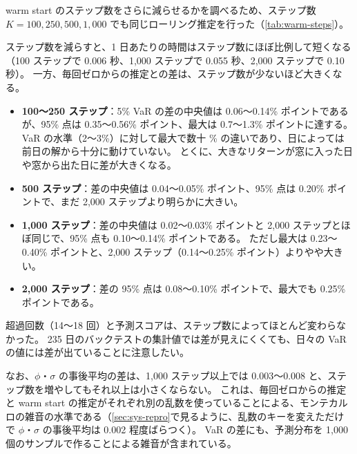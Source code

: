 warm start のステップ数をさらに減らせるかを調べるため、ステップ数 $K = 100, 250, 500, 1{,}000$ でも同じローリング推定を行った（\cref{tab:warm-steps}）。

\begin{table}[tbp]
  \centering
  \caption{warm start のステップ数と、毎回ゼロからの推定（10,000 ステップ）との差（推定窓 250 日、検証 235 日、初日を除く）。
    差は日ごとの差の絶対値の要約。超過は 5\% VaR の超過回数、予測スコアは対数予測スコアの平均、時間は 1 日あたりの最適化の時間の中央値。
    2,000 ステップと毎回ゼロからの行は\cref{tab:var-backtest}と同じ推定。}
  \label{tab:warm-steps}
  \small
  \setlength{\tabcolsep}{4pt}
  
\end{table}

ステップ数を減らすと、1 日あたりの時間はステップ数にほぼ比例して短くなる（100 ステップで 0.006 秒、1,000 ステップで 0.055 秒、2,000 ステップで 0.10 秒）。
一方、毎回ゼロからの推定との差は、ステップ数が少ないほど大きくなる。
\begin{itemize}
  \item \textbf{100〜250 ステップ}：5\% VaR の差の中央値は 0.06〜0.14\% ポイントであるが、95\% 点は 0.35〜0.56\% ポイント、最大は 0.7〜1.3\% ポイントに達する。
    VaR の水準（2〜3\%）に対して最大で数十 \% の違いであり、日によっては前日の解から十分に動けていない。
    とくに、大きなリターンが窓に入った日や窓から出た日に差が大きくなる。
  \item \textbf{500 ステップ}：差の中央値は 0.04〜0.05\% ポイント、95\% 点は 0.20\% ポイントで、まだ 2,000 ステップより明らかに大きい。
  \item \textbf{1,000 ステップ}：差の中央値は 0.02〜0.03\% ポイントと 2,000 ステップとほぼ同じで、95\% 点も 0.10〜0.14\% ポイントである。
    ただし最大は 0.23〜0.40\% ポイントと、2,000 ステップ（0.14〜0.25\% ポイント）よりやや大きい。
  \item \textbf{2,000 ステップ}：差の 95\% 点は 0.08〜0.10\% ポイントで、最大でも 0.25\% ポイントである。
\end{itemize}
超過回数（14〜18 回）と予測スコアは、ステップ数によってほとんど変わらなかった。
235 日のバックテストの集計値では差が見えにくくても、日々の VaR の値には差が出ていることに注意したい。

なお、$\phi$・$\sigma$ の事後平均の差は、1,000 ステップ以上では 0.003〜0.008 と、ステップ数を増やしてもそれ以上は小さくならない。
これは、毎回ゼロからの推定と warm start の推定がそれぞれ別の乱数を使っていることによる、モンテカルロの雑音の水準である（\cref{sec:sys-repro}で見るように、乱数のキーを変えただけで $\phi$・$\sigma$ の事後平均は 0.002 程度ばらつく）。
VaR の差にも、予測分布を 1,000 個のサンプルで作ることによる雑音が含まれている。

